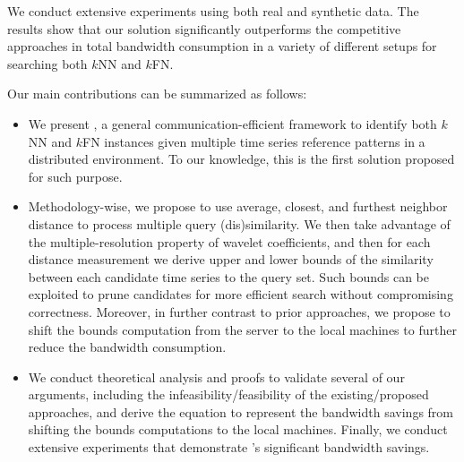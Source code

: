 We conduct extensive experiments using both real and synthetic data. The
results show that our solution significantly outperforms the
competitive approaches in total bandwidth consumption in a variety of
different setups for searching both $k$NN and $k$FN.

Our main contributions can be summarized as follows:
\begin{itemize}
\item
We present \MSWave{}, a general communication-efficient framework to
identify both $k$NN and $k$FN instances given multiple time series reference patterns in
a distributed environment. To our knowledge, this is the
first solution proposed for such purpose.
\item
Methodology-wise, we propose to use average, closest, and
furthest neighbor distance to process multiple query (dis)similarity.
We then take advantage of the multiple-resolution property
of wavelet coefficients, and then for each distance measurement we derive
upper and lower bounds of the similarity between each candidate time series
to the query set. Such bounds can be exploited
to prune candidates for more efficient search without compromising correctness. Moreover,
in further contrast to prior approaches, we propose to shift the
bounds computation from the server to the local machines to further reduce the bandwidth
consumption.
\item
We conduct theoretical analysis and proofs to validate several
of our arguments, including the infeasibility/feasibility of the
existing/proposed approaches, and derive the equation to represent the
bandwidth savings from shifting the bounds computations to the local machines.
Finally, we conduct extensive experiments that demonstrate \MSWave{}'s 
significant bandwidth savings.
\end{itemize}

